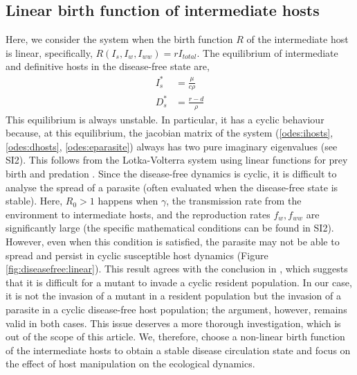 \documentclass[11pt]{article}
\begin{document}
\subsection*{Linear birth function of intermediate hosts}
Here, we consider the system when the birth function $R$ of the intermediate host is linear, specifically, $R(I_s, I_w, I_{ww}) = r I_{total}$. 
The equilibrium of intermediate and definitive hosts in the disease-free state are,
%
\begin{align*}
 I_s^* &= \frac{\mu}{c \rho} \\
 D_s^* &= \frac{r - d}{\rho}
\end{align*}
%
This equilibrium is always unstable. 
In particular, it has a cyclic behaviour because, at this equilibrium, the jacobian matrix of the system (\ref{odes:ihosts}, \ref{odes:dhosts}, \ref{odes:eparasite}) always has two pure imaginary eigenvalues (see SI2). 
This follows from the Lotka-Volterra system using linear functions for prey birth and predation \citep{Lotka1920}.
Since the disease-free dynamics is cyclic, it is difficult to analyse the spread of a parasite (often evaluated when the disease-free state is stable). 
Here,  $R_0 > 1$  happens when $\gamma$, the transmission rate from the environment to intermediate hosts, and the reproduction rates $f_w, f_{ww}$ are significantly large (the specific mathematical conditions can be found in SI2). 
However, even when this condition is satisfied, the parasite may not be able to spread and persist in cyclic susceptible host dynamics (Figure \ref{fig:diseasefree:linear}). 
This result agrees with the conclusion in \citep{Ripa:Evol:2013}, which suggests that it is difficult for a mutant to invade a cyclic resident population. 
In our case, it is not the invasion of a mutant in a resident population but the invasion of a parasite in a cyclic disease-free host population; the argument, however, remains valid in both cases. 
This issue deserves a more thorough investigation, which is out of the scope of this article. 
We, therefore, choose a non-linear birth function of the intermediate hosts to obtain a stable disease circulation state and focus on the effect of host manipulation on the ecological dynamics. 
\end{document}
